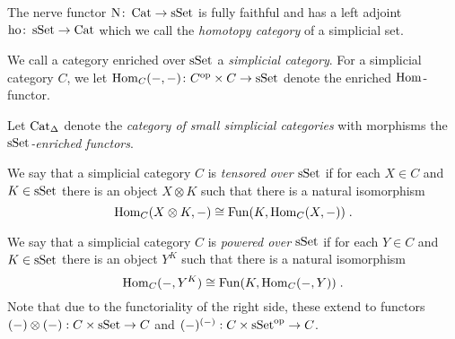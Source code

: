 \begin{lemma}\label{lem:nerveFF}
    The nerve functor $\operatorname{N}\colon\operatorname{Cat}\to\operatorname{sSet}$ is fully faithful and has a left adjoint $\operatorname{ho}\colon\operatorname{sSet}\to\operatorname{Cat}$ which we call the \emph{homotopy category} of a simplicial set.
    \begin{reference}
        \cite[Proposition 1.2.2.1]{kerodon}
    \end{reference}
\end{lemma}
\begin{definition}
    We call a category enriched over $\operatorname{sSet}$ a \emph{simplicial category}.
    For a simplicial category $C$, we let $\operatorname{Hom}_C(-,-)\colon C^{\operatorname{op}}\times C\to\operatorname{sSet}$ denote the enriched $\operatorname{Hom}$-functor.
   
    Let $\operatorname{Cat}_{\Delta}$ denote the \emph{category of small simplicial categories} with morphisms the \emph{$\operatorname{sSet}$-enriched functors}.
    
    We say that a simplicial category $C$ is \emph{tensored over $\operatorname{sSet}$} if for each $X\in C$ and $K\in\operatorname{sSet}$ there is an object $X\otimes K$ such that there is a natural isomorphism
    \begin{equation*}
        \operatorname{Hom}_C(X\otimes K,-)\cong\operatorname{Fun}(K,\operatorname{Hom}_C(X,-))\;.
    \end{equation*}

    We say that a simplicial category $C$ is \emph{powered over $\operatorname{sSet}$} if for each $Y\in C$ and $K\in\operatorname{sSet}$ there is an object $Y^K$ such that there is a natural isomorphism
    \begin{equation*}
        \operatorname{Hom}_C(-,Y^K)\cong\operatorname{Fun}(K,\operatorname{Hom}_C(-,Y))\;.
    \end{equation*}
    Note that due to the functoriality of the right side, these extend to functors $(-)\otimes(-):C\times\operatorname{sSet}\to C$ and $(-)^{(-)}:C\times\operatorname{sSet}^{\operatorname{op}}\to C$.
\end{definition}
